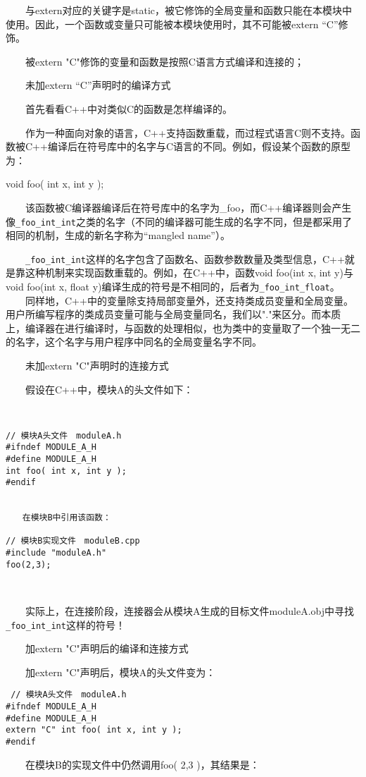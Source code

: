 　　与extern对应的关键字是static，被它修饰的全局变量和函数只能在本模块中使用。因此，一个函数或变量只可能被本模块使用时，其不可能被extern “C”修饰。

　　被extern "C"修饰的变量和函数是按照C语言方式编译和连接的；

　　未加extern “C”声明时的编译方式

　　首先看看C++中对类似C的函数是怎样编译的。

　　作为一种面向对象的语言，C++支持函数重载，而过程式语言C则不支持。函数被C++编译后在符号库中的名字与C语言的不同。例如，假设某个函数的原型为：

void foo( int x, int y );


　　该函数被C编译器编译后在符号库中的名字为\_foo，而C++编译器则会产生像\verb|_foo_int_int|之类的名字（不同的编译器可能生成的名字不同，但是都采用了相同的机制，生成的新名字称为“mangled name”）。

　　\verb|_foo_int_int|这样的名字包含了函数名、函数参数数量及类型信息，C++就是靠这种机制来实现函数重载的。例如，在C++中，函数void foo(int x, int y)与void foo(int x, float y)编译生成的符号是不相同的，后者为\verb|_foo_int_float|。
　　同样地，C++中的变量除支持局部变量外，还支持类成员变量和全局变量。用户所编写程序的类成员变量可能与全局变量同名，我们以"."来区分。而本质上，编译器在进行编译时，与函数的处理相似，也为类中的变量取了一个独一无二的名字，这个名字与用户程序中同名的全局变量名字不同。

　　未加extern "C"声明时的连接方式

　　假设在C++中，模块A的头文件如下：
\begin{verbatim}
　

// 模块A头文件　moduleA.h
#ifndef MODULE_A_H
#define MODULE_A_H
int foo( int x, int y );
#endif


　　在模块B中引用该函数：

// 模块B实现文件　moduleB.cpp
#include "moduleA.h"
foo(2,3);
\end{verbatim} 　

　　实际上，在连接阶段，连接器会从模块A生成的目标文件moduleA.obj中寻找\verb|_foo_int_int|这样的符号！

　　加extern "C"声明后的编译和连接方式

　　加extern "C"声明后，模块A的头文件变为：
\begin{verbatim}
 // 模块A头文件　moduleA.h
#ifndef MODULE_A_H
#define MODULE_A_H
extern "C" int foo( int x, int y );
#endif
\end{verbatim} 

　　在模块B的实现文件中仍然调用foo( 2,3 )，其结果是：

